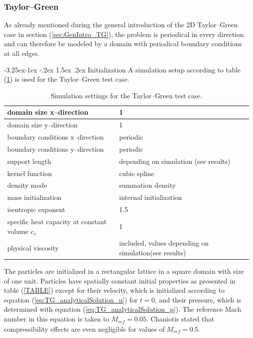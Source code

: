\documentclass{report}
\makeatletter
\renewcommand\paragraph{\@startsection{paragraph}{4}{\z@}%
  {-3.25ex\@plus -1ex \@minus -.2ex}%
  {1.5ex \@plus .2ex}%
  {\normalfont\normalsize\bfseries}}
\makeatother
\begin{document}
\subsubsection{Taylor--Green}
\label{sec:SimuSetup_TG}
As already mentioned during the general introduction of the 2D Taylor--Green case in section (\ref{sec:GenIntro_TG}), the problem is periodical in every direction and can therefore be modeled by a domain with periodical boundary conditions at all edges.

\paragraph{Initialization}
A simulation setup according to table (\ref{tab:SimuSettings_TG}) is used for the Taylor--Green test case.

\begin{table}[h] %
\label{tab:SimuSettings_TG}
\centering

\begin{tabular}[c]{|l|p{5cm}|} %
\hline
\hline
domain size x--direction &  1\\
\hline
domain size y--direction &  1\\
\hline
boundary conditions x--direction & periodic\\
\hline
boundary conditions y--direction & periodic\\
\hline
support length & depending on simulation \newline (see results)  \\
\hline
kernel function & cubic spline \\
\hline
density mode & summation density \\
\hline
mass initialization & internal initialization \\
\hline
isentropic exponent & 1.5\\
\hline
specific heat capacity at constant volume $c_v$ & 1\\
\hline
physical viscosity& included, values depending on simulation\newline (see results)\\ 
\hline
\hline
\end{tabular}
\caption[]{Simulation settings for the Taylor--Green test case.}

\end{table}


The particles are initialized in a rectangular lattice in a square domain with size of one unit. Particles have spatially constant initial properties as presented in table (\ref{TABLE}) except for their velocity, which is initialized according to equation (\ref{eq:TG_analyticalSolution_u}) for $t=0$, and their pressure, which is determined with equation (\ref{eq:TG_analyticalSolution_p}). The reference Mach number in this equation is taken to $M_\mathit{ref}=0.05$. Chaniotis \cite{Chaniotis2002} stated that compressibility effects are even negligible for values of $M_\mathit{ref}=0.5$.
\end{document}
